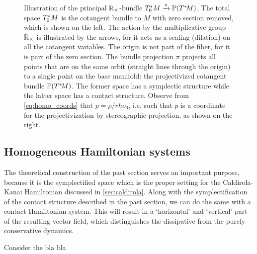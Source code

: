 \begin{figure}[ht]
    \begin{center}
        
    \end{center}
    \caption{Illustration of the principal $\mathbb{R}_{\times}$-bundle $T^*_0M\xrightarrow[]{\pi}\mathbb{P}\qty(T^*\!M)$. The total space $T^*_0M$ is the cotangent bundle to $M$ with zero section removed, which is shown on the left. The action by the multiplicative group $\mathbb{R}_{\times}$ is illustrated by the arrows, for it acts as a scaling (dilation) on all the cotangent variables. The origin is not part of the fiber, for it is part of the zero section. The bundle projection $\pi$ projects all points that are on the same orbit (straight lines through the origin) to a single point on the base manifold: the projectivized cotangent bundle $\mathbb{P}\qty(T^*\!M)$. The former space has a symplectic structure while the latter space has a contact structure. Observe from \cref{eq:homo_coords} that $p = \rho/rho_0$, i.e. such that $p$ is a coordinate for the projectivization by stereographic projection, as shown on the right.}
    \label{fig:principal_bundle}
\end{figure}

\subsection{Homogeneous Hamiltonian systems} The theoretical construction of the past section serves an important purpose, because it is the symplectified space which is the proper setting for the Caldirola-Kanai Hamiltonian discussed in \cref{sec:caldirola}. Along with the symplectification of the contact structure described in the past section, we can do the same with a contact Hamiltonian system. This will result in a `horizontal' and `vertical' part of the resulting vector field, which distinguishes the dissipative from the purely conservative dynamics.

Consider the bla bla


%
